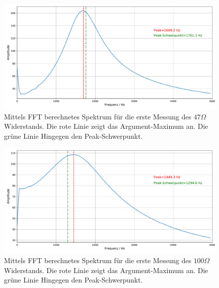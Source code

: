 \documentclass[a4paper, 12pt]{scrartcl}
\begin{document}
\begin{figure}[H]
\centering
\includegraphics[width=\textwidth]{plots/fft/fft_schwingung5_1.pdf}
\caption{Mittels FFT berechnetes Spektrum für die erste Messung des $47\Omega$ Widerstands. Die rote Linie zeigt das Argument-Maximum an. Die grüne Linie Hingegen den Peak-Schwerpunkt.}
\end{figure}
\begin{figure}[H]
\centering
\includegraphics[width=\textwidth]{plots/fft/fft_schwingung6_1.pdf}
\caption{Mittels FFT berechnetes Spektrum für die erste Messung des $100\Omega$ Widerstands. Die rote Linie zeigt das Argument-Maximum an. Die grüne Linie Hingegen den Peak-Schwerpunkt.}
\end{figure}
\end{document}
